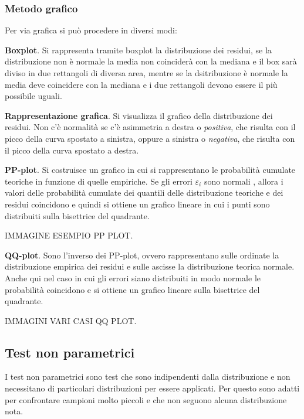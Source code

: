 \subsubsection{Metodo grafico}
Per via grafica si può procedere in diversi modi:

\textbf{Boxplot}. Si rappresenta tramite boxplot la distribuzione dei residui, se la distribuzione non è normale la media non coinciderà con la mediana e il box sarà diviso in due rettangoli di diversa area, mentre se la dsitribuzione è normale la media deve coincidere con la mediana e i due rettangoli devono essere il più possibile uguali.

\textbf{Rappresentazione grafica}. Si visualizza il grafico della distribuzione dei residui. Non c'è normalità se c'è asimmetria a destra o \textit{positiva}, che risulta con il picco della curva spostato a sinistra, oppure a sinistra o \textit{negativa}, che risulta con il picco della curva spostato a destra.

\textbf{PP-plot}. Si costruisce un grafico in cui si rappresentano le probabilità cumulate teoriche in funzione di quelle empiriche. Se gli errori $\varepsilon_i$ sono normali , allora i valori delle probabilità cumulate dei quantili delle distribuzione teoriche e dei residui coincidono e quindi si ottiene un grafico lineare in cui i punti sono distribuiti sulla bisettrice del quadrante.

IMMAGINE ESEMPIO PP PLOT.

\textbf{QQ-plot}. Sono l'inverso dei PP-plot, ovvero rappresentano sulle ordinate la distribuzione empirica dei residui e sulle ascisse la distribuzione teorica normale. Anche qui nel caso in cui gli errori siano distribuiti in modo normale le probabilità coincidono e si ottiene un grafico lineare sulla bisettrice del quadrante.

IMMAGINI VARI CASI QQ PLOT.

\subsection{Test non parametrici}
I test non parametrici sono test che sono indipendenti dalla distribuzione e non necessitano di particolari distribuzioni per essere applicati. Per questo sono adatti per confrontare campioni molto piccoli e che non seguono alcuna distribuzione nota.

